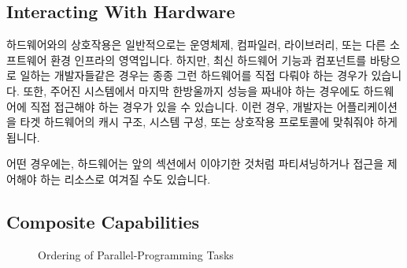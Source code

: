 \subsection{Interacting With Hardware}
\label{sec:Interacting With Hardware}

하드웨어와의 상호작용은 일반적으로는 운영체제, 컴파일러, 라이브러리, 또는 다른
소프트웨어 환경 인프라의 영역입니다.
하지만, 최신 하드웨어 기능과 컴포넌트를 바탕으로 일하는 개발자들같은 경우는
종종 그런 하드웨어를 직접 다뤄야 하는 경우가 있습니다.
또한, 주어진 시스템에서 마지막 한방울까지 성능을 짜내야 하는 경우에도
하드웨어에 직접 접근해야 하는 경우가 있을 수 있습니다.
이런 경우, 개발자는 어플리케이션을 타겟 하드웨어의 캐시 구조, 시스템 구성, 또는
상호작용 프로토콜에 맞춰줘야 하게 됩니다.

어떤 경우에는, 하드웨어는 앞의 섹션에서 이야기한 것처럼 파티셔닝하거나 접근을
제어해야 하는 리소스로 여겨질 수도 있습니다.

\subsection{Composite Capabilities}
\label{sec:Composite Capabilities}

\begin{figure}[tb]
\begin{center}
\end{center}
\caption{Ordering of Parallel-Programming Tasks}
\label{fig:intro:Ordering of Parallel-Programming Tasks}
\end{figure}

